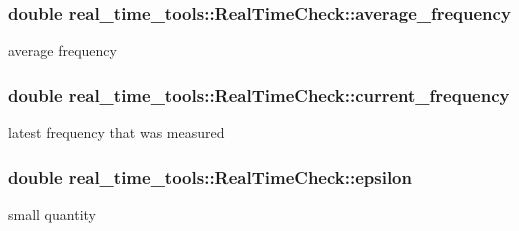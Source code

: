 \subsubsection[{\texorpdfstring{average\+\_\+frequency}{average_frequency}}]{\setlength{\rightskip}{0pt plus 5cm}double real\+\_\+time\+\_\+tools\+::\+Real\+Time\+Check\+::average\+\_\+frequency\hspace{0.3cm}{\ttfamily [private]}}\hypertarget{classreal__time__tools_1_1RealTimeCheck_a3ffb6de7e7c01a7248c2293e29b98011}{}\label{classreal__time__tools_1_1RealTimeCheck_a3ffb6de7e7c01a7248c2293e29b98011}
average frequency 
\subsubsection[{\texorpdfstring{current\+\_\+frequency}{current_frequency}}]{\setlength{\rightskip}{0pt plus 5cm}double real\+\_\+time\+\_\+tools\+::\+Real\+Time\+Check\+::current\+\_\+frequency\hspace{0.3cm}{\ttfamily [private]}}\hypertarget{classreal__time__tools_1_1RealTimeCheck_a935b4c6b8ebf569e6510d47376f8499f}{}\label{classreal__time__tools_1_1RealTimeCheck_a935b4c6b8ebf569e6510d47376f8499f}
latest frequency that was measured 
\subsubsection[{\texorpdfstring{epsilon}{epsilon}}]{\setlength{\rightskip}{0pt plus 5cm}double real\+\_\+time\+\_\+tools\+::\+Real\+Time\+Check\+::epsilon\hspace{0.3cm}{\ttfamily [private]}}\hypertarget{classreal__time__tools_1_1RealTimeCheck_ab6a059be584e4a92254002d35713d0df}{}\label{classreal__time__tools_1_1RealTimeCheck_ab6a059be584e4a92254002d35713d0df}
small quantity 
